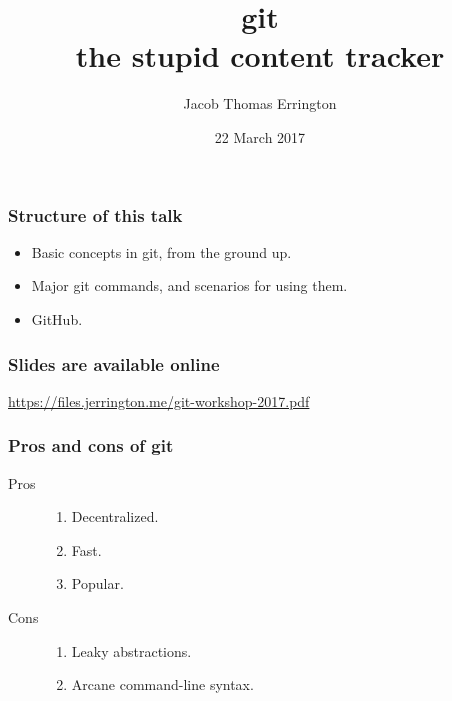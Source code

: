 \documentclass{beamer}
\author{Jacob Thomas Errington}
\title{
    git\\
    the stupid content tracker
}
\institute{McGill University}
\date{22 March 2017}
\begin{document}
\frame{\titlepage}

\begin{frame}
    \frametitle{Structure of this talk}

    \begin{itemize}
        \item
            Basic concepts in git, from the ground up.

        \item
            Major git commands, and scenarios for using them.

        \item
            GitHub.
    \end{itemize}
\end{frame}

\begin{frame}
    \frametitle{Slides are available online}

    \url{https://files.jerrington.me/git-workshop-2017.pdf}
\end{frame}

\begin{frame}
    \frametitle{Pros and cons of git}

    \begin{description}
        \item[Pros]
            \begin{enumerate}
                \item Decentralized.
                \item Fast.
                \item Popular.
            \end{enumerate}

        \item[Cons]
            \begin{enumerate}
                \item Leaky abstractions.
                \item Arcane command-line syntax.
            \end{enumerate}
    \end{description}
\end{frame}
\end{document}
